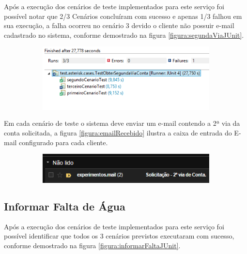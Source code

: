  Após a execução dos cenários de teste implementados para este serviço foi possível notar que 2/3 Cenários concluíram com sucesso e apenas 1/3 falhou em sua execução, a falha ocorreu no cenário 3 devido o cliente não possuir e-mail cadastrado no sistema, conforme demostrado na figura \ref{figura:segundaViaJUnit}.	
 \begin{figure}[H]
 	\centering
		\caption{\textbf{Obter 2ª Via de Conta - Detalhes execução dos testes}}
		\label{figura:segundaViaJUnit}
 	\begin{subfigure}[H]{\textwidth}
 		\centering
 		\includegraphics{figuras/cenarios/segunda_via/junit_result.PNG}
 	\end{subfigure}
 \end{figure}	
	

Em cada cenário de teste o sistema deve enviar um e-mail contendo a 2ª via da conta solicitada, a figura \ref{figura:emailRecebido} ilustra a caixa de entrada do E-mail configurado para cada cliente.
\begin{figure}[H]
	\centering
	\caption{\textbf{Obter 2ª Via de Conta - E-mail recebido pelo cliente}}
	\label{figura:emailRecebido}
	\begin{subfigure}[H]{\textwidth}
		\centering
		\includegraphics{figuras/cenarios/segunda_via/envio_email.PNG}
	\end{subfigure}
\end{figure}

	
\subsection{\textbf{Informar Falta de Água}}

 Após a execução dos cenários de teste implementados para este serviço foi possível identificar que todos os 3 cenários previstos executaram com sucesso, conforme demostrado na figura \ref{figura:informarFaltaJUnit}.	

